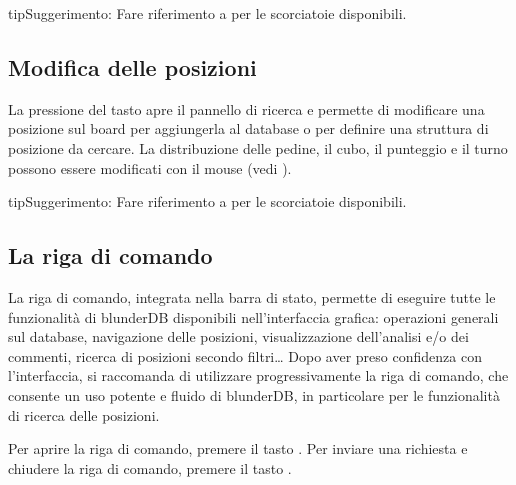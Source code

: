 \documentclass[letterpaper,10pt,italian]{sphinxmanual}
\begin{document}
\begin{sphinxadmonition}{tip}{Suggerimento:}
\sphinxAtStartPar
Fare riferimento a {\hyperref[\detokenize{raccourcis:raccourcis}]{}} per le scorciatoie disponibili.
\end{sphinxadmonition}


\subsection{Modifica delle posizioni}
\label{\detokenize{manuel:edition-de-positions}}\label{\detokenize{manuel:edition-positions}}
\sphinxAtStartPar
La pressione del tasto  apre il pannello di ricerca e permette di modificare una posizione sul board per aggiungerla al database o per definire una struttura di posizione da cercare. La distribuzione delle pedine, il cubo, il punteggio e il turno possono essere modificati con il mouse (vedi {\hyperref[\detokenize{guide_utilisateur:guide-edit-position}]{}}).

\begin{sphinxadmonition}{tip}{Suggerimento:}
\sphinxAtStartPar
Fare riferimento a {\hyperref[\detokenize{raccourcis:raccourcis}]{}} per le scorciatoie disponibili.
\end{sphinxadmonition}


\subsection{La riga di comando}
\label{\detokenize{manuel:la-ligne-de-commande}}\label{\detokenize{manuel:ligne-commande}}
\sphinxAtStartPar
La riga di comando, integrata nella barra di stato, permette di eseguire tutte le funzionalità di blunderDB disponibili nell’interfaccia grafica: operazioni generali sul database, navigazione delle posizioni, visualizzazione dell’analisi e/o dei commenti, ricerca di posizioni secondo filtri… Dopo aver preso confidenza con l’interfaccia, si raccomanda di utilizzare progressivamente la riga di comando, che consente un uso potente e fluido di blunderDB, in particolare per le funzionalità di ricerca delle posizioni.

\sphinxAtStartPar
Per aprire la riga di comando, premere il tasto . Per inviare una richiesta e chiudere la riga di comando, premere il tasto .
\end{document}
